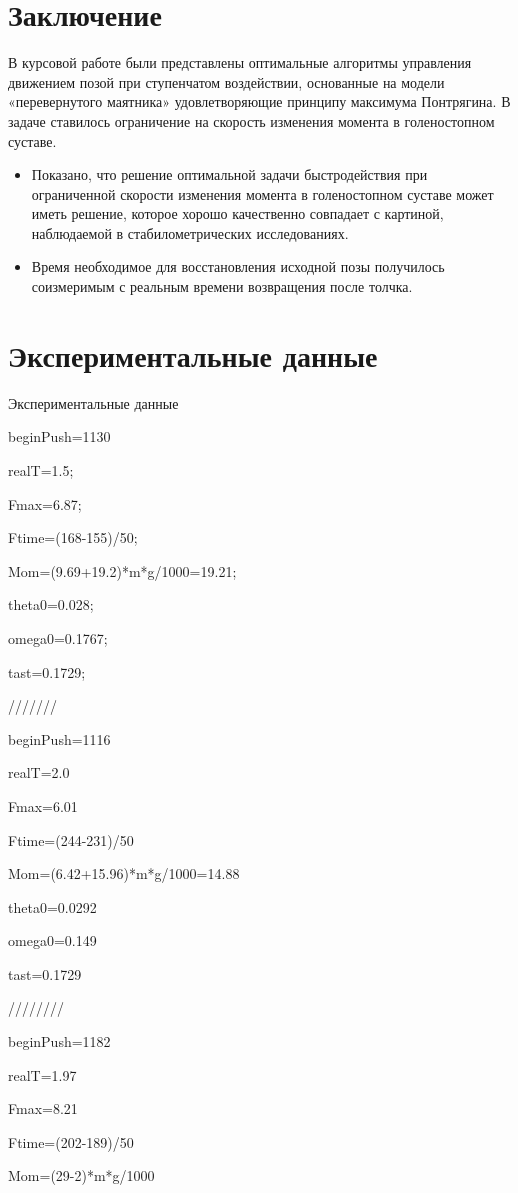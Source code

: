 \documentclass[a4paper,14pt]{article}
\theoremstyle{plain} %
\theoremstyle{definition} %
\theoremstyle{remark} %
\begin{document}
{\section{Заключение}
В курсовой работе были представлены оптимальные алгоритмы управления
движением позой при ступенчатом воздействии, основанные на модели
«перевернутого маятника» удовлетворяющие принципу максимума Понтрягина.
В задаче ставилось ограничение на скорость изменения момента в голеностопном суставе.
\begin{itemize}
    \item Показано, что решение оптимальной задачи быстродействия при ограниченной скорости изменения момента в голеностопном суставе может иметь решение, которое хорошо качественно совпадает с картиной, наблюдаемой в стабилометрических исследованиях.
    \item Время необходимое для восстановления исходной позы получилось соизмеримым с реальным времени возвращения после толчка.
\end{itemize}
\newpage
\section{Экспериментальные данные }
Экспериментальные данные  

beginPush=1130


realT=1.5;

Fmax=6.87;

Ftime=(168-155)/50;

Mom=(9.69+19.2)*m*g/1000=19.21;

theta0=0.028;

omega0=0.1767;

tast=0.1729;

///////

beginPush=1116


realT=2.0

Fmax=6.01

Ftime=(244-231)/50

Mom=(6.42+15.96)*m*g/1000=14.88

theta0=0.0292

omega0=0.149

tast=0.1729

////////

beginPush=1182


realT=1.97

Fmax=8.21

Ftime=(202-189)/50

Mom=(29-2)*m*g/1000

}
\end{document}
